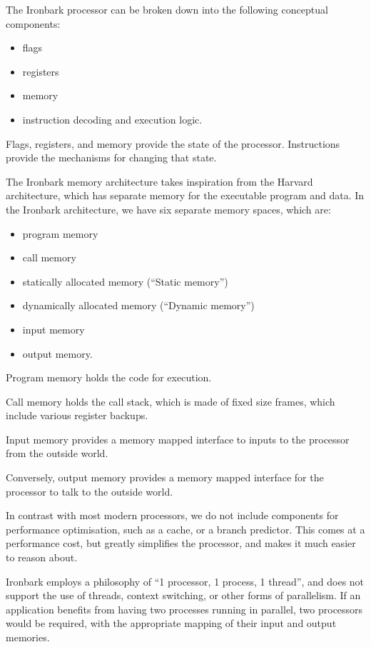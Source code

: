\documentclass[11pt,a4paper]{article}
\begin{document}
The Ironbark processor can be broken down into the following conceptual components:

\begin{itemize}
  \item flags
  \item registers
  \item memory
  \item instruction decoding and execution logic.
\end{itemize}

Flags, registers, and memory provide the state of the processor. Instructions provide the mechanisms for changing that state.

The Ironbark memory architecture takes inspiration from the Harvard architecture, which has separate memory for the executable program and data. In the Ironbark architecture, we have six separate memory spaces, which are:

\begin{itemize}
  \item program memory
  \item call memory
  \item statically allocated memory (“Static memory”)
  \item dynamically allocated memory (“Dynamic memory”)
  \item input memory
  \item output memory.
\end{itemize}

Program memory holds the code for execution.

Call memory holds the call stack, which is made of fixed size frames, which include various register backups.

Input memory provides a memory mapped interface to inputs to the processor from the outside world.

Conversely, output memory provides a memory mapped interface for the processor to talk to the outside world.

In contrast with most modern processors, we do not include components for performance optimisation, such as a cache, or a branch predictor. This comes at a performance cost, but greatly simplifies the processor, and makes it much easier to reason about.

Ironbark employs a philosophy of “1 processor, 1 process, 1 thread”, and does not support the use of threads, context switching, or other forms of parallelism. If an application benefits from having two processes running in parallel, two processors would be required, with the appropriate mapping of their input and output memories.
\end{document}

